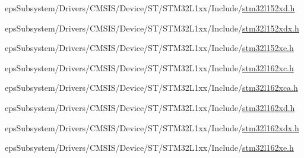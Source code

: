\begin{DoxyCompactItemize}
eps\-Subsystem/\-Drivers/\-C\-M\-S\-I\-S/\-Device/\-S\-T/\-S\-T\-M32\-L1xx/\-Include/\hyperlink{stm32l152xd_8h}{stm32l152xd.\-h}\item 
eps\-Subsystem/\-Drivers/\-C\-M\-S\-I\-S/\-Device/\-S\-T/\-S\-T\-M32\-L1xx/\-Include/\hyperlink{stm32l152xdx_8h}{stm32l152xdx.\-h}\item 
eps\-Subsystem/\-Drivers/\-C\-M\-S\-I\-S/\-Device/\-S\-T/\-S\-T\-M32\-L1xx/\-Include/\hyperlink{stm32l152xe_8h}{stm32l152xe.\-h}\item 
eps\-Subsystem/\-Drivers/\-C\-M\-S\-I\-S/\-Device/\-S\-T/\-S\-T\-M32\-L1xx/\-Include/\hyperlink{stm32l162xc_8h}{stm32l162xc.\-h}\item 
eps\-Subsystem/\-Drivers/\-C\-M\-S\-I\-S/\-Device/\-S\-T/\-S\-T\-M32\-L1xx/\-Include/\hyperlink{stm32l162xca_8h}{stm32l162xca.\-h}\item 
eps\-Subsystem/\-Drivers/\-C\-M\-S\-I\-S/\-Device/\-S\-T/\-S\-T\-M32\-L1xx/\-Include/\hyperlink{stm32l162xd_8h}{stm32l162xd.\-h}\item 
eps\-Subsystem/\-Drivers/\-C\-M\-S\-I\-S/\-Device/\-S\-T/\-S\-T\-M32\-L1xx/\-Include/\hyperlink{stm32l162xdx_8h}{stm32l162xdx.\-h}\item 
eps\-Subsystem/\-Drivers/\-C\-M\-S\-I\-S/\-Device/\-S\-T/\-S\-T\-M32\-L1xx/\-Include/\hyperlink{stm32l162xe_8h}{stm32l162xe.\-h}\end{DoxyCompactItemize}

